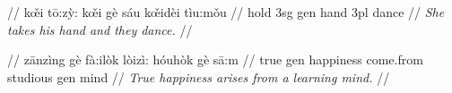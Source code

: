 \documentclass{article}
\begin{document}
\ex
\begingl
\gla {}       //
\glb k\v{\oe}i t\=o:z\`y: k\v{\oe}i g\`e s\'{a}u k\v{\oe}id\`ei t\`iu:m\v{o}u //
 hold {\sc 3sg} {\sc gen} hand {\sc 3pl} dance //
\glft \textit{She takes his hand and they dance.} //
\endgl
\xe

\ex
\begingl
\gla {}       //
\glb z\=anz\`{i}ng g\`e f\`a:il\`ok l\`oiz\`{i}: h\'{o}uh\`ok g\`e s\=a:m //
\glc true {\sc gen} happiness come.from studious {\sc gen} mind //
\glft \textit{True happiness arises from a learning mind.} //
\endgl
\xe
\end{document}
